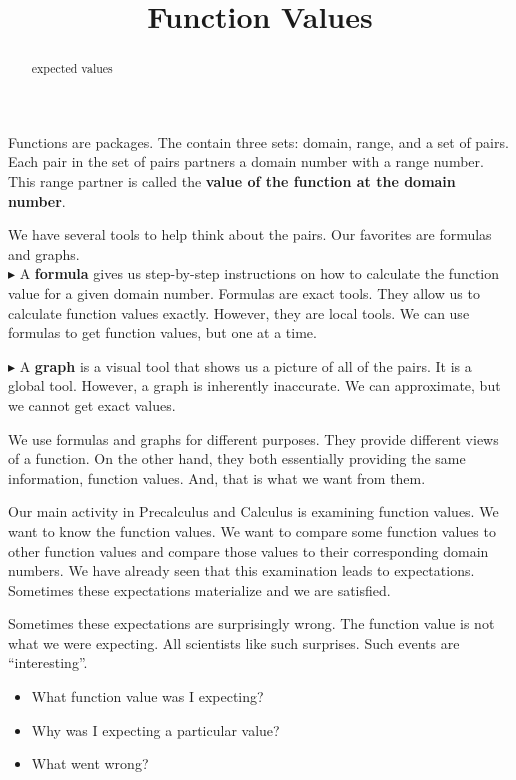 \documentclass{ximera}
\title{Function Values}
\begin{document}
\begin{abstract}
expected values
\end{abstract}
\maketitle




Functions are packages.  The contain three sets: domain, range, and a set of pairs.  Each pair in the set of pairs partners a domain number with a range number.  This range partner is called the \textbf{value of the function \textcolor{purple!85!blue}{at} the domain number}.


We have several tools to help think about the pairs. Our favorites are formulas and graphs. \\


$\blacktriangleright$ A \textbf{\textcolor{purple!85!blue}{formula}} gives us step-by-step instructions on how to calculate the function value for a given domain number.   Formulas are exact tools. They allow us to calculate function values exactly. However, they are local tools.  We can use formulas to get function values, but one at a time.


$\blacktriangleright$ A \textbf{\textcolor{purple!85!blue}{graph}} is a visual tool that shows us a picture of all of the pairs.  It is a global tool. However, a graph is inherently inaccurate.  We can approximate, but we cannot get exact values.  


We use formulas and graphs for different purposes. They provide different views of a function.  On the other hand, they both essentially providing the same information, function values. And, that is what we want from them.


Our main activity in Precalculus and Calculus is examining function values.  We want to know the function values.  We want to compare some function values to other function values and compare those values to their corresponding domain numbers.  We have already seen that this examination leads to expectations.  Sometimes these expectations materialize and we are satisfied.  

Sometimes these expectations are surprisingly wrong.  The function value is not what we were expecting. All scientists like such surprises. Such events are ``interesting''. 

\begin{itemize}
\item What function value was I expecting?
\item Why was I expecting a particular value?
\item What went wrong?
\end{itemize} 
\end{document}
